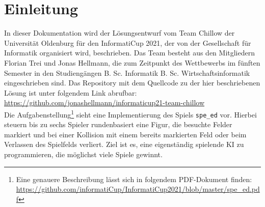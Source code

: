 \chapter{Einleitung}
\label{ch:einleitung}

In dieser Dokumentation wird der Lösungsentwurf vom Team Chillow der Universität Oldenburg für den InformatiCup 2021,
der von der Gesellschaft für Informatik organisiert wird, beschrieben.
Das Team besteht aus den Mitgliedern Florian Trei und Jonas Hellmann, die zum Zeitpunkt des Wettbewerbs im fünften
Semester in den Studiengängen B. Sc. Informatik \bzw B. Sc. Wirtschaftsinformatik eingeschrieben sind.
Das Repository mit dem Quellcode zu der hier beschriebenen Lösung ist unter folgendem Link abrufbar:
\url{https://github.com/jonashellmann/informaticup21-team-chillow} \\

Die Aufgabenstellung\footnote{Eine genauere Beschreibung lässt sich in folgendem PDF-Dokument finden:
\url{https://github.com/informatiCup/InformatiCup2021/blob/master/spe\_ed.pdf}} sieht eine Implementierung des Spiels
\texttt{spe\_ed} vor.
Hierbei steuern bis zu sechs Spieler rundenbasiert eine Figur, die besuchte Felder markiert und bei einer Kollision
mit einem bereits markierten Feld oder beim Verlassen des Spielfelds verliert.
Ziel ist es, eine eigenständig spielende \ac{KI} zu programmieren, die möglichst viele Spiele gewinnt.